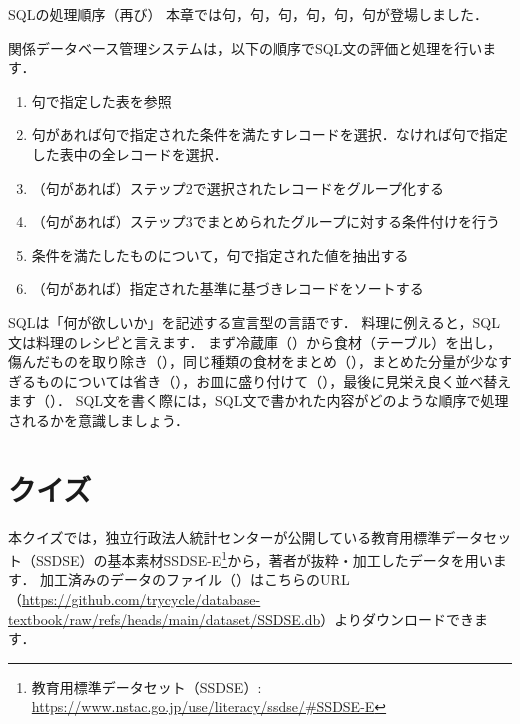 \begin{notebox}{SQLの処理順序（再び）}
本章では句，句，句，句，句，句が登場しました．

関係データベース管理システムは，以下の順序でSQL文の評価と処理を行います．
\begin{enumerate}
\item {}句で指定した表を参照
\item {}句があれば句で指定された条件を満たすレコードを選択．なければ句で指定した表中の全レコードを選択．
\item （句があれば）ステップ2で選択されたレコードをグループ化する
\item （句があれば）ステップ3でまとめられたグループに対する条件付けを行う
\item 条件を満たしたものについて，句で指定された値を抽出する
\item （句があれば）指定された基準に基づきレコードをソートする
\end{enumerate}

SQLは「何が欲しいか」を記述する宣言型の言語です．
料理に例えると，SQL文は料理のレシピと言えます．
まず冷蔵庫（）から食材（テーブル）を出し，傷んだものを取り除き（），同じ種類の食材をまとめ（），まとめた分量が少なすぎるものについては省き（），お皿に盛り付けて（），最後に見栄え良く並べ替えます（）．
SQL文を書く際には，SQL文で書かれた内容がどのような順序で処理されるかを意識しましょう．
\end{notebox}


\hrulefill
\section{クイズ}

本クイズでは，独立行政法人統計センターが公開している教育用標準データセット（SSDSE）の基本素材SSDSE-E\footnote{教育用標準データセット（SSDSE）: \url{https://www.nstac.go.jp/use/literacy/ssdse/\#SSDSE-E}}から，著者が抜粋・加工したデータを用います．
加工済みのデータのファイル（）はこちらのURL（\url{https://github.com/trycycle/database-textbook/raw/refs/heads/main/dataset/SSDSE.db}）よりダウンロードできます．

